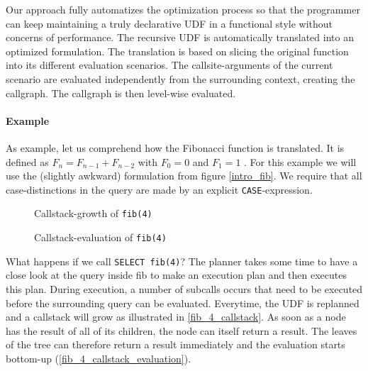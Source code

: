 Our approach fully automatizes the optimization process so that the programmer can keep maintaining a truly declarative UDF in a functional style without concerns of performance. The recursive UDF is automatically translated into an optimized formulation. The translation is based on slicing the original function into its different evaluation scenarios. The callsite-arguments of the current scenario are evaluated independently from the surrounding context, creating the callgraph. The callgraph is then level-wise evaluated.

\paragraph*{Example}

As example, let us comprehend how the Fibonacci function is translated. It is defined as $F_n = F_{n-1} + F_{n-2}$ with $F_0 = 0$ and $F_1 = 1$ \cite[p. 79]{TAOCP_Knuth}. For this example we will use the (slightly awkward) formulation from figure \autoref{intro_fib}. We require that all case-distinctions in the query are made by an explicit \texttt{CASE}-expression.

\begin{figure}[h]\small
    \begin{minipage}[b]{.47\linewidth}
        
        \caption{Callstack-growth of \texttt{fib(4)}}
        \label{fib_4_callstack}
    \end{minipage}\hfill
    \begin{minipage}[b]{.5\linewidth}
    
        \caption{Callstack-evaluation of \texttt{fib(4)}}
        \label{fib_4_callstack_evaluation}
    \end{minipage}
\end{figure}

What happens if we call \texttt{SELECT fib(4)}? The planner takes some time to have a close look at the query inside fib to make an execution plan and then executes this plan. During execution, a number of subcalls occurs that need to be executed before the surrounding query can be evaluated. Everytime, the UDF is replanned and a callstack will grow as illustrated in \autoref{fib_4_callstack}. As soon as a node has the result of all of its children, the node can itself return a result. The leaves of the tree can therefore return a result immediately and the evaluation starts bottom-up (\autoref{fib_4_callstack_evaluation}). 


